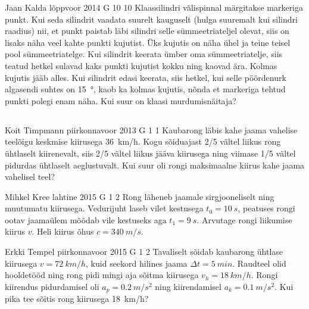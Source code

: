 \documentclass[11pt, twoside]{article}
\begin{document}
{%
{Jaan Kalda} %
{lõppvoor} %
{2014} %
{G 10} %
{10} %
{
\ifStatement
Klaassilindri välispinnal märgitakse markeriga punkt. Kui seda silindrit vaadata suurelt kauguselt (hulga suuremalt kui silindri raadius) nii, et punkt paistab läbi silindri selle sümmeetriateljel olevat, siis on lisaks näha veel kahte punkti kujutist. Üks kujutis on näha ühel ja teine teisel pool sümmeetriatelge. Kui silindrit keerata ümber oma sümmeetriatelje, siis teatud hetkel sulavad kaks punkti kujutist kokku ning kaovad ära. Kolmas kujutis jääb alles. Kui silindrit edasi keerata, siis hetkel, kui selle pöördenurk algasendi suhtes on \SI{15}{\degree}, kaob ka kolmas kujutis, nõnda et markeriga tehtud punkti polegi enam näha. Kui suur on klaasi murdumisnäitaja?
\fi
}
\newpage\subsection{\protect{}}

{Koit Timpmann} %
{piirkonnavoor} %
{2013} %
{G 1} %
{1} %
{
\ifStatement
Kaubarong läbis kahe jaama vahelise teelõigu keskmise kiirusega \SI{36}{km/h}.
Kogu sõiduajast 2/5 vältel liikus rong ühtlaselt kiirenevalt, siis 2/5 vältel
liikus jääva kiirusega ning viimase 1/5 vältel pidurdas ühtlaselt aeglustuvalt.
Kui suur oli rongi maksimaalne kiirus kahe jaama vahelisel teel?
\fi
}

{Mihkel Kree} %
{lahtine} %
{2015} %
{G 1} %
{2} %
{
\ifStatement
Rong läheneb jaamale sirgjooneliselt ning muutumatu kiirusega. Vedurijuht laseb vilet kestusega $t_0=\SI{10}{s}$, peatuses rongi ootav jaamaülem mõõdab vile kestuseks aga $t_1=\SI{9}{s}$. Arvutage rongi liikumise kiirus $v$. Heli kiirus õhus $c=\SI{340}{m/s}$.
\fi
}

{Erkki Tempel} %
{piirkonnavoor} %
{2015} %
{G 1} %
{2} %
{
\ifStatement
Tavaliselt sõidab kaubarong ühtlase kiirusega $v=\SI{72}{km/h}$, kuid seekord hilines jaama $\Delta t=\SI{5}{min}$. Raudteel olid hooldetööd ning rong pidi mingi aja sõitma kiirusega $v_{h}=\SI{18}{km/h}$. Rongi kiirendus pidurdamisel oli $a_p=\SI{0,2}{m/s^2}$ ning kiirendamisel $a_k=\SI{0,1}{m/s^2}$. Kui pika tee sõitis rong kiirusega \SI{18}{km/h}?
\fi
}

}
\end{document}
